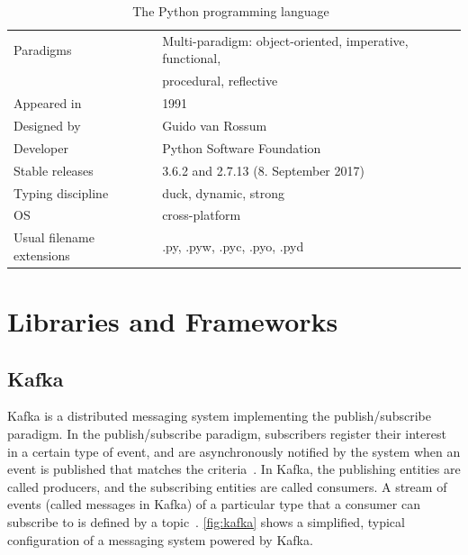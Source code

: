 \begin{table}
    \caption{The Python programming language~\cite{van2007python}}
    \label{table:python}
    \vspace{0.2cm}
    \begin{tabular}{l | l} %
        Paradigms
        & Multi-paradigm: object-oriented, imperative, functional,
        \\ & procedural, reflective
        \\ \midrule
        Appeared in
        & 1991
        \\ \midrule
        Designed by
        & Guido van Rossum
        \\ \midrule
        Developer
        & Python Software Foundation
        \\ \midrule
        Stable releases
        & 3.6.2 and 2.7.13 (8. September 2017)
        \\ \midrule
        Typing discipline
        & duck, dynamic, strong
        \\ \midrule
        OS
        & cross-platform
        \\ \midrule
        Usual filename extensions
        & .py, .pyw, .pyc, .pyo, .pyd
    \end{tabular}
\end{table}

\section{Libraries and Frameworks}
\label{sec:libraries}

\subsection{Kafka}
\label{subsec:kafka}

Kafka is a distributed messaging system implementing the publish/subscribe paradigm.
In the publish/subscribe paradigm, subscribers register their interest in a certain type of event,
and are asynchronously notified by the system when an event is published that matches the criteria~\cite{Eugster2003}.
In Kafka, the publishing entities are called producers, and the subscribing entities are called consumers.
A stream of events (called messages in Kafka) of a particular type that a consumer can subscribe to is defined by a topic~\cite{Kreps2015}.
\ref{fig:kafka} shows a simplified, typical configuration of a messaging system powered by Kafka.

